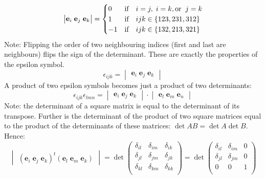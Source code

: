 \documentclass[11pt, oneside]{article}   	%
\begin{document}
\begin{equation}
    \begin{vmatrix} \mathbf{e}_i\;\mathbf{e}_j\;\mathbf{e}_k \end{vmatrix}
    = 
    \begin{cases}
        0 & \hbox{if}\quad i=j,\; i=k,\hbox{or}\; \; j=k \\
        1 & \hbox{if}\quad ijk \in \{123, 231, 312\} \\
        -1 & \hbox{if}\quad  ijk \in \{132, 213, 321\}
    \end{cases}
\end{equation}
Note: Flipping the order of two neighbouring indices (first and last are neighbours) flips the sign of the 
determinant. These are exactly the properties of the epsilon symbol.
\begin{equation}
    \epsilon_{ijk} = \begin{vmatrix} \mathbf{e}_i\;\mathbf{e}_j\;\mathbf{e}_k \end{vmatrix}
\end{equation}
A product of two epsilon symbols becomes just a product of two determinants:
\begin{equation}
    \epsilon_{ijk}\epsilon_{lmn} = \begin{vmatrix} \mathbf{e}_i\;\mathbf{e}_j\;\mathbf{e}_k \end{vmatrix}
        \cdot \begin{vmatrix} \mathbf{e}_l\;\mathbf{e}_m\;\mathbf{e}_n \end{vmatrix}
\end{equation}
Note: the determinant of a square matrix is equal to the determinant of its transpose. Further is the 
determinant of the product of two square matrices equal to the product of the determinants of these
matrices: $\det AB = \det A \det B$.
Hence:
\begin{equation}
    \begin{vmatrix} (\mathbf{e}_i\;\mathbf{e}_j\;\mathbf{e}_k)^t
    (\mathbf{e}_l\;\mathbf{e}_m\;\mathbf{e}_k) \end{vmatrix}
    = \det 
    \begin{pmatrix}
        \delta_{il} & \delta_{im} & \delta_{ik} \\
        \delta_{jl} & \delta_{jm} & \delta_{jk} \\
        \delta_{kl} & \delta_{km} & \delta_{kk} \\
    \end{pmatrix}
    = \det
    \begin{pmatrix}
        \delta_{il} & \delta_{im} & 0 \\
        \delta_{jl} & \delta_{jm} & 0 \\
        0              & 0           & 1 \\
    \end{pmatrix}
\end{equation}
\end{document}
